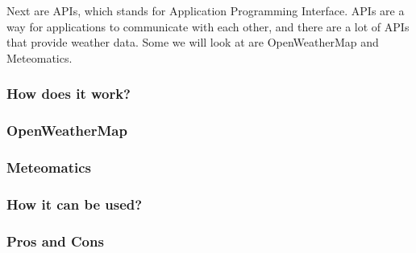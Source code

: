 \documentclass[../paper.tex]{subfiles}
\begin{document}
    Next are APIs, which stands for Application Programming Interface.
    APIs are a way for applications to communicate with each other, and there are a lot of APIs that provide weather data.
    Some we will look at are OpenWeatherMap and Meteomatics.

    \subsubsection{How does it work?}

    \subsubsection{OpenWeatherMap}

    \subsubsection{Meteomatics}

    \subsubsection{How it can be used?}

    \subsubsection{Pros and Cons}
\end{document}
